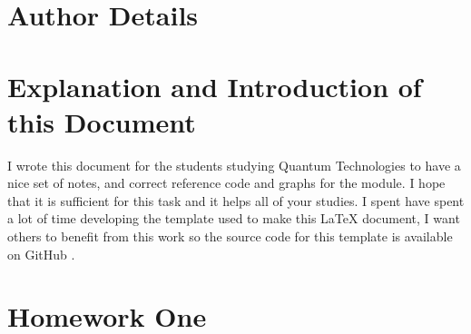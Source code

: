 \documentclass[colorlinks,11pt,a4paper,normalphoto,withhyper,ragged2e]{altareport}
\begin{document}
\MakeReportTitlePage


\setcounter{page}{1}





\section*{Author Details}
\makeauthordetails

\setcounter{tocdepth}{2} 
\tableofcontents %





\section*{Explanation and Introduction of this Document}
I wrote this document for the students studying Quantum Technologies to have a nice set of notes, and correct reference code and graphs for the module. I hope that it is sufficient for this task and it helps all of your studies. \linebreak
I spent have spent a lot of time developing the template used to make this {\LaTeX} document, I want others to benefit from this work so the source code for this template is available on GitHub \cite{latex_template_github}.
\newpage
{} %





\section{Homework One}
\end{document}
